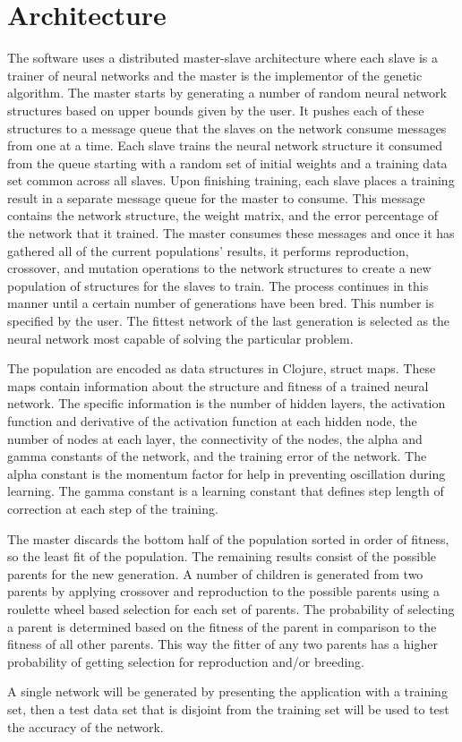 \section{Architecture}
The software uses a distributed master-slave architecture where each slave is a trainer of neural networks and the master is the implementor of the genetic algorithm. The master starts by generating a number of random neural network structures based on upper bounds given by the user. It pushes each of these structures to a message queue that the slaves on the network consume messages from one at a time. Each slave trains the neural network structure it consumed from the queue starting with a random set of initial weights and a training data set common across all slaves. Upon finishing training, each slave places a training result in a separate message queue for the master to consume. This message contains the network structure, the weight matrix, and the error percentage of the network that it trained. The master consumes these messages and once it has gathered all of the current populations' results, it performs reproduction, crossover, and mutation operations to the network structures to create a new population of structures for the slaves to train. The process continues in this manner until a certain number of generations have been bred. This number is specified by the user. The fittest network of the last generation is selected as the neural network most capable of solving the particular problem.  

The population are encoded as data structures in Clojure, struct maps. These maps contain information about the structure and fitness of a trained neural network. The specific information is the number of hidden layers, the activation function and derivative of the activation function at each hidden node, the number of nodes at each layer, the connectivity of the nodes, the alpha and gamma constants of the network, and the training error of the network. The alpha constant is the momentum factor for help in preventing oscillation during learning. The gamma constant is a learning constant that defines step length of correction at each step of the training.

The master discards the bottom half of the population sorted in order of fitness, so the least fit of the population. The remaining results consist of the possible parents for the new generation. A number of children is generated from two parents by applying crossover and reproduction to the possible parents using a roulette wheel based selection for each set of parents. The probability of selecting a parent is determined based on the fitness of the parent in comparison to the fitness of all other parents. This way the fitter of any two parents has a higher probability of getting selection for reproduction and/or breeding.

A single network will be generated by presenting the application with a training set, then a test data set that is disjoint from the training set will be used to test the accuracy of the network.  
